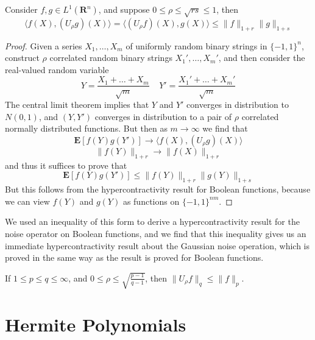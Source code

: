 \begin{theorem}
    Consider $f,g \in L^1(\mathbf{R}^n)$, and suppose $0 \leq \rho \leq \sqrt{rs} \leq 1$, then
    \[ \langle f(X), (U_\rho g)(X) \rangle = \langle (U_\rho f)(X), g(X) \rangle \leq \| f \|_{1 + r} \| g \|_{1 + s} \]
\end{theorem}
\begin{proof}
    Given a series $X_1, \dots, X_m$ of uniformly random binary strings in $\{ -1, 1 \}^n$, construct $\rho$ correlated random binary strings $X_1', \dots, X_m'$, and then consider the real-valued random variable
    \[ Y = \frac{X_1 + \dots + X_m}{\sqrt{m}}\ \ \ \ \ Y' = \frac{X_1' + \dots + X_m'}{\sqrt{m}} \]
    The central limit theorem implies that $Y$ and $Y'$ converges in distribution to $N(0,1)$, and $(Y,Y')$ converges in distribution to a pair of $\rho$ correlated normally distributed functions. But then as $m \to \infty$ we find that
    \[ \mathbf{E}[f(Y)g(Y')] \to \langle f(X), (U_\rho g)(X) \rangle \]
    \[ \| f(Y) \|_{1 + r} \to \| f(X) \|_{1 + r} \]
    and thus it suffices to prove that
    \[ \mathbf{E}[f(Y)g(Y')] \leq \| f(Y) \|_{1 + r} \| g(Y) \|_{1 + s} \]
    But this follows from the hypercontractivity result for Boolean functions, because we can view $f(Y)$ and $g(Y)$ as functions on $\{ -1, 1 \}^{nm}$.
\end{proof}

We used an inequality of this form to derive a hypercontractivity result for the noise operator on Boolean functions, and we find that this inequality gives us an immediate hypercontractivity result about the Gaussian noise operation, which is proved in the same way as the result is proved for Boolean functions.

\begin{corollary}
    If $1 \leq p \leq q \leq \infty$, and $0 \leq \rho \leq \sqrt{\frac{p-1}{q-1}}$, then $\| U_\rho f \|_q \leq \| f \|_p$.
\end{corollary}

\section{Hermite Polynomials}

